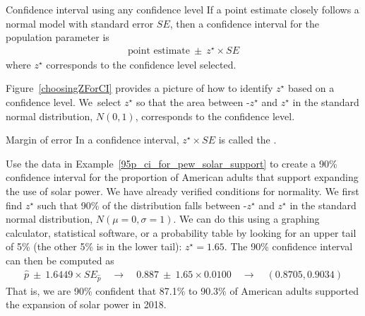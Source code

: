 \begin{onebox}{Confidence interval using any confidence level}
  If a point estimate closely follows a normal model
  with standard error $SE$, then a confidence interval
  for the population parameter is
  \begin{align*}
  \text{point estimate}\ \pm\ z^{\star} \times SE
  \end{align*}
  where $z^{\star}$ corresponds to the confidence
  level selected.
\end{onebox}

Figure~\ref{choosingZForCI} provides a picture of how to identify
$z^{\star}$ based on a confidence level. We~select $z^{\star}$
so that the area between -$z^{\star}$ and $z^{\star}$ in the
standard normal distribution,
$N(0, 1)$, corresponds to the confidence level.

\begin{onebox}{Margin of error}
  \label{marginOfErrorTermBox}%
  In a confidence interval, $z^{\star}\times SE$ is called the
  .
\end{onebox}

\begin{examplewrap}
\begin{nexample}{Use the data in
    Example~\ref{95p_ci_for_pew_solar_support} to
    create a 90\% confidence interval for the proportion of American
    adults that support expanding the use of solar power.
    We have already verified conditions for normality.}
  We first find $z^{\star}$ such that 90\% of the distribution falls
  between -$z^{\star}$ and $z^{\star}$ in the
  standard normal distribution, $N(\mu = 0, \sigma = 1)$.
  We can do this using a graphing calculator,
  statistical software, or a probability table by looking for an
  upper tail of 5\% (the other 5\% is in the lower tail):
  $z^{\star}=1.65$.
  The 90\% confidence interval can then be computed as
  \begin{align*}
  \hat{p}\ \pm\ 1.6449 \times SE_{\hat{p}}
      \quad\to\quad 0.887\ \pm\ 1.65 \times 0.0100
      \quad\to\quad (0.8705, 0.9034)
  \end{align*}
  That is, we are 90\% confident that 87.1\% to 90.3\% of American
  adults supported the expansion of solar power in 2018.
\end{nexample}
\end{examplewrap}

